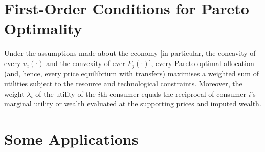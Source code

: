 \section{First-Order Conditions for Pareto Optimality}

\begin{prop}
    Under the assumptions made about the economy [in particular, the concavity of every $u_i(\cdot)$ and the convexity of ever $F_j(\cdot)$], every Pareto optimal allocation (and, hence, every price equilibrium with transfers) maximises a weighted sum of utilities subject to the resource and technological constraints. Moreover, the weight $\lambda_i$ of the utility of the $i$th consumer equals the reciprocal of consumer $i$'s marginal utility or wealth evaluated at the supporting prices and imputed wealth.
\end{prop}


\section{Some Applications}

\begin{defn}
    
\end{defn}

\begin{prop}
    
\end{prop}
